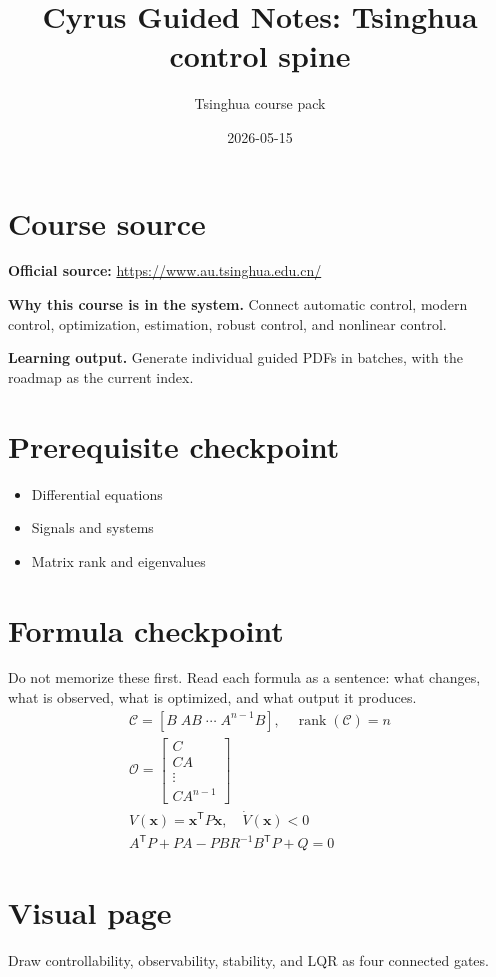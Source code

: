 \documentclass[11pt]{article}
\title{Cyrus Guided Notes: Tsinghua control spine}
\author{Tsinghua course pack}
\date{2026-05-15}
\begin{document}
\maketitle

\section*{Course source}
\textbf{Official source:} \url{https://www.au.tsinghua.edu.cn/}

\textbf{Why this course is in the system.} Connect automatic control, modern control, optimization, estimation, robust control, and nonlinear control.

\textbf{Learning output.} Generate individual guided PDFs in batches, with the roadmap as the current index.

\section*{Prerequisite checkpoint}
\begin{itemize}[leftmargin=1.4em]
  \item Differential equations
  \item Signals and systems
  \item Matrix rank and eigenvalues
\end{itemize}

\section*{Formula checkpoint}
Do not memorize these first. Read each formula as a sentence: what changes, what is observed, what is optimized, and what output it produces.
\begin{align*}
  \mathcal{C}=[B\;AB\;\cdots\;A^{n-1}B],\quad \operatorname{rank}(\mathcal{C})=n\\
  \mathcal{O}=\begin{bmatrix}C\\CA\\\vdots\\CA^{n-1}\end{bmatrix}\\
  V(\bm{x})=\bm{x}^{\mathsf T}P\bm{x},\quad \dot{V}(\bm{x})<0\\
  A^{\mathsf T}P+PA-PBR^{-1}B^{\mathsf T}P+Q=0
\end{align*}

\section*{Visual page}
Draw controllability, observability, stability, and LQR as four connected gates.
\end{document}
